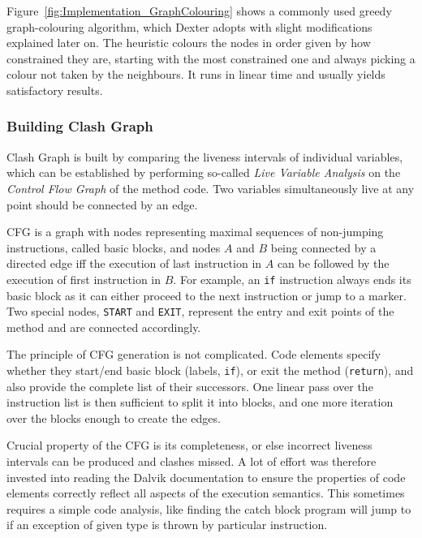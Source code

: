 \documentclass[12pt,twoside,notitlepage]{report}
\begin{document}
Figure~\ref{fig:Implementation_GraphColouring} shows a commonly used greedy graph-colouring algorithm, which Dexter adopts with slight modifications explained later on. The heuristic colours the nodes in order given by how constrained they are, starting with the most constrained one and always picking a colour not taken by the neighbours. It runs in linear time and usually yields satisfactory results.

\subsubsection{Building Clash Graph}

Clash Graph is built by comparing the liveness intervals of individual variables, which can be established by performing so-called \emph{Live Variable Analysis} on the \emph{Control Flow Graph} of the method code. Two variables simultaneously live at any point should be connected by an edge.

CFG is a graph with nodes representing maximal sequences of non-jumping instructions, called basic blocks, and nodes $A$ and $B$ being connected by a directed edge iff the execution of last instruction in $A$ can be followed by the execution of first instruction in $B$. For example, an \verb$if$ instruction always ends its basic block as it can either proceed to the next instruction or jump to a marker. Two special nodes, \verb$START$ and \verb$EXIT$, represent the entry and exit points of the method and are connected accordingly.

The principle of CFG generation is not complicated. Code elements specify whether they start/end basic block (labels, \verb$if$), or exit the method (\verb$return$), and also provide the complete list of their successors. One linear pass over the instruction list is then sufficient to split it into blocks, and one more iteration over the blocks enough to create the edges.

Crucial property of the CFG is its completeness, or else incorrect liveness intervals can be produced and clashes missed. A lot of effort was therefore invested into reading the Dalvik documentation to ensure the properties of code elements correctly reflect all aspects of the execution semantics. This sometimes requires a simple code analysis, like finding the catch block program will jump to if an exception of given type is thrown by particular instruction. 
\end{document}
